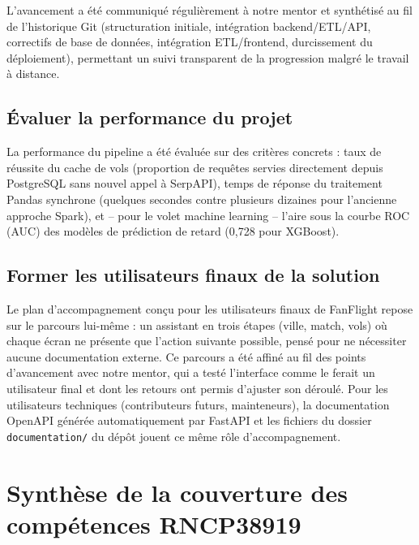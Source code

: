 \documentclass[11pt,a4paper]{report}
\newcommand{\code}[1]{\lstinline{#1}}
\begin{document}
L'avancement a été communiqué régulièrement à notre mentor et synthétisé au fil de l'historique Git (structuration initiale, intégration backend/ETL/API, correctifs de base de données, intégration ETL/frontend, durcissement du déploiement), permettant un suivi transparent de la progression malgré le travail à distance.

\subsection{Évaluer la performance du projet}

La performance du pipeline a été évaluée sur des critères concrets : taux de réussite du cache de vols (proportion de requêtes servies directement depuis PostgreSQL sans nouvel appel à SerpAPI), temps de réponse du traitement Pandas synchrone (quelques secondes contre plusieurs dizaines pour l'ancienne approche Spark), et -- pour le volet machine learning -- l'aire sous la courbe ROC (AUC) des modèles de prédiction de retard (0,728 pour XGBoost).

\subsection{Former les utilisateurs finaux de la solution}

Le plan d'accompagnement conçu pour les utilisateurs finaux de FanFlight repose sur le parcours lui-même : un assistant en trois étapes (ville, match, vols) où chaque écran ne présente que l'action suivante possible, pensé pour ne nécessiter aucune documentation externe. Ce parcours a été affiné au fil des points d'avancement avec notre mentor, qui a testé l'interface comme le ferait un utilisateur final et dont les retours ont permis d'ajuster son déroulé. Pour les utilisateurs techniques (contributeurs futurs, mainteneurs), la documentation OpenAPI générée automatiquement par FastAPI et les fichiers du dossier \code{documentation/} du dépôt jouent ce même rôle d'accompagnement.

\section{Synthèse de la couverture des compétences RNCP38919}
\end{document}
